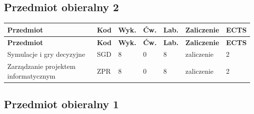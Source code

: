 \documentclass[12pt,a4paper]{article}
\newcommand{\thdrule}{\noalign{\global\setlength{\extrarowheight}{0pt}}}
\newcommand{\thdend}{\noalign{\global\setlength{\extrarowheight}{4pt}}}
\begin{document}
\subsection*{Przedmiot obieralny 2}

{\scriptsize
\begin{longtable}{m{5.5cm}m{0.8cm}m{1cm}m{1cm}m{1cm}m{1.7cm}m{0.7cm}}
\thdrule\toprule
\rowcolor{pjatkRed}
{\color{white}\footnotesize\textbf{\vphantom{Ag}Przedmiot}} & {\color{white}\footnotesize\textbf{\vphantom{Ag}Kod}} & {\color{white}\footnotesize\textbf{\vphantom{Ag}Wyk.}} & {\color{white}\footnotesize\textbf{\vphantom{Ag}Ćw.}} & {\color{white}\footnotesize\textbf{\vphantom{Ag}Lab.}} & {\color{white}\footnotesize\textbf{\vphantom{Ag}Zaliczenie}} & {\color{white}\footnotesize\textbf{\vphantom{Ag}ECTS}} \\
\midrule\thdend
\endfirsthead
\thdrule\toprule
\rowcolor{pjatkRed}
{\color{white}\footnotesize\textbf{\vphantom{Ag}Przedmiot}} & {\color{white}\footnotesize\textbf{\vphantom{Ag}Kod}} & {\color{white}\footnotesize\textbf{\vphantom{Ag}Wyk.}} & {\color{white}\footnotesize\textbf{\vphantom{Ag}Ćw.}} & {\color{white}\footnotesize\textbf{\vphantom{Ag}Lab.}} & {\color{white}\footnotesize\textbf{\vphantom{Ag}Zaliczenie}} & {\color{white}\footnotesize\textbf{\vphantom{Ag}ECTS}} \\
\midrule\thdend
\endhead
\rowcolor{tableRowLight} Symulacje i gry decyzyjne & SGD & 8 & 0 & 8 & {\scriptsize zaliczenie} & 2 \\
\rowcolor{tableRowAlt} Zarządzanie projektem informatycznym & ZPR & 8 & 0 & 8 & {\scriptsize zaliczenie} & 2 \\
\bottomrule
\end{longtable}}

\subsection*{Przedmiot obieralny 1}
\end{document}

